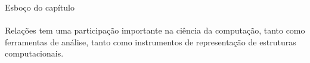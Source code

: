 
{\large Esboço do capítulo}
\\
\\
Relações tem uma participação importante na ciência da computação, tanto como ferramentas de análise, tanto como instrumentos
de representação de estruturas computacionais.